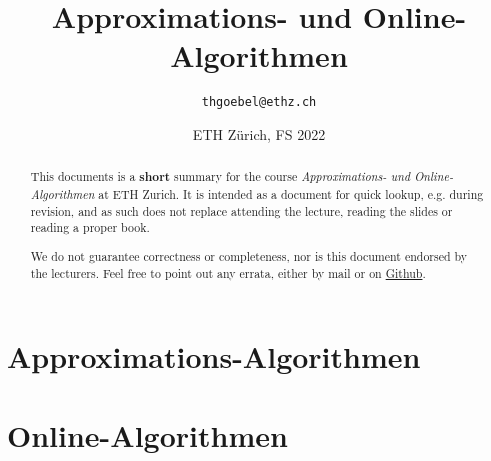 \documentclass[paper=a4, parskip=half-]{scrartcl}
\title{Approximations- und Online-Algorithmen}
\author{\texttt{thgoebel@ethz.ch}}
\date{ETH Zürich, FS 2022}
\begin{document}
\begin{titlepage}
\maketitle
\vspace{5cm}
\thispagestyle{empty}


\begin{abstract}
This documents is a \textbf{short} summary for the course
\textit{Approximations- und Online-Algorithmen} at ETH Zurich.
It is intended as a document for quick lookup, e.g. during revision,
and as such does not replace attending the lecture, reading the slides or reading a proper book.

We do not guarantee correctness or completeness, nor is this document endorsed by the lecturers.
Feel free to point out any errata, either by mail or on
\href{https://github.com/eth-cs-student-summaries/Approximations-und-Online-Algorithmen}{Github}.
\end{abstract}

\end{titlepage}

\tableofcontents
\newpage

\newpage

\part{Approximations-Algorithmen}


\newpage


\newpage


\newpage


\part{Online-Algorithmen}


\newpage
\end{document}
